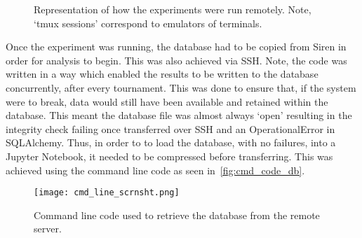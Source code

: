 \begin{figure}
    \centering
    
    \caption{Representation of how the experiments were run remotely. Note, `tmux sessions' correspond to emulators of terminals.}\label{fig:remote_comp}
\end{figure}

Once the experiment was running, the database had to be copied from
Siren in order for analysis to begin. This was also achieved via SSH\@. Note, the code was written in a way
which enabled the results to be written to the database concurrently, after
every tournament. This was done to ensure that, if the system were to break, data
would still have been available and retained within the database. This meant
the database file was almost always `open' resulting in the integrity check
failing once transferred over SSH and an OperationalError in SQLAlchemy. Thus, in
order to to load the database, with no failures, into a Jupyter Notebook, it
needed to be compressed before transferring. This was achieved using the command
line code as seen in~\autoref{fig:cmd_code_db}.

\begin{figure}
    \centering
    \texttt{[image: cmd\_line\_scrnsht.png]}
    \caption{Command line code used to retrieve the database from the remote server.}\label{fig:cmd_code_db}
\end{figure}

